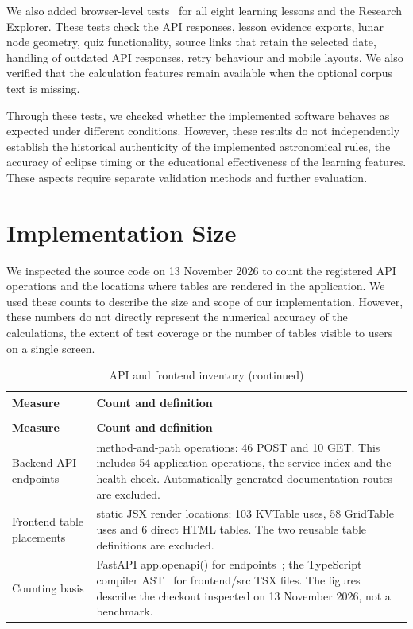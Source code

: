 \documentclass[12pt,a4paper,oneside]{report}
\begin{document}
We also added browser-level tests~\cite{playwright} for all eight learning lessons and the Research Explorer. These tests check the API responses, lesson evidence exports, lunar node geometry, quiz functionality, source links that retain the selected date, handling of outdated API responses, retry behaviour and mobile layouts. We also verified that the calculation features remain available when the optional corpus text is missing.

Through these tests, we checked whether the implemented software behaves as expected under different conditions. However, these results do not independently establish the historical authenticity of the implemented astronomical rules, the accuracy of eclipse timing or the educational effectiveness of the learning features. These aspects require separate validation methods and further evaluation.

\section{Implementation Size}

We inspected the source code on 13 November 2026 to count the registered API operations and the locations where tables are rendered in the application. We used these counts to describe the size and scope of our implementation. However, these numbers do not directly represent the numerical accuracy of the calculations, the extent of test coverage or the number of tables visible to users on a single screen.

\begin{longtable}[]{@{}
  >{\raggedright\arraybackslash}p{}
  >{\raggedright\arraybackslash}p{}@{}}
\caption{API and frontend inventory}\label{tab:inventory}\\
\toprule\noalign{}
\textbf{Measure} & \textbf{Count and definition} \\
\midrule\noalign{}
\endfirsthead
\caption[]{API and frontend inventory (continued)}\\
\toprule\noalign{}
\textbf{Measure} & \textbf{Count and definition} \\
\midrule\noalign{}
\endhead
\bottomrule\noalign{}
\endlastfoot
Backend API endpoints & 56 method-and-path operations: 46 POST and 10 GET. This includes 54 application operations, the service index and the health check. Automatically generated documentation routes are excluded. \\
Frontend table placements & 167 static JSX render locations: 103 KVTable uses, 58 GridTable uses and 6 direct HTML tables. The two reusable table definitions are excluded. \\
Counting basis & FastAPI app.openapi() for endpoints~\cite{fastapi}; the TypeScript compiler AST~\cite{typescript} for frontend/src TSX files. The figures describe the checkout inspected on 13 November 2026, not a benchmark. \\
\end{longtable}
\end{document}
